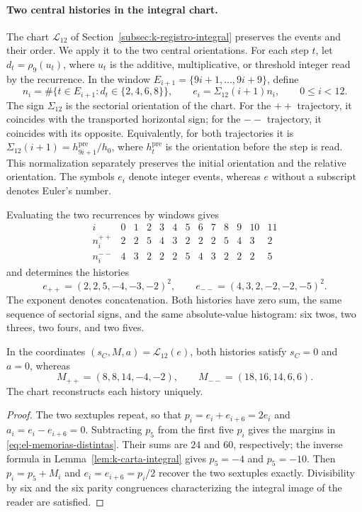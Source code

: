 \paragraph{Two central histories in the integral chart.}
The chart \(\mathcal L_{12}\) of
Section~\ref{subsec:k-registro-integral} preserves the events and their
order. We apply it to the two central orientations. For each
step \(t\), let \(d_t=\rho_9(u_t)\), where \(u_t\) is the additive,
multiplicative, or threshold integer read by the recurrence.
In the window \(E_{i+1}=\{9i+1,\ldots,9i+9\}\), define
\[
 n_i=\#\{t\in E_{i+1}:d_t\in\{2,4,6,8\}\},\qquad
 e_i=\Sigma_{12}(i+1)n_i,\qquad0\le i<12.
\]
The sign \(\Sigma_{12}\) is the sectorial orientation of the chart.
For the \({++}\) trajectory, it coincides with the transported
horizontal sign; for the \({--}\) trajectory, it coincides with its opposite.
Equivalently, for both trajectories it is
\(\Sigma_{12}(i+1)=h^{\mathrm{pre}}_{9i+1}/h_0\), where
\(h^{\mathrm{pre}}_t\) is the orientation before the step is read.
This normalization separately preserves the initial orientation and
the relative orientation. The symbols \(e_i\) denote integer
events, whereas \(e\) without a subscript denotes Euler's number.

Evaluating the two recurrences by windows gives
\[
\begin{array}{c|rrrrrrrrrrrr}
i&0&1&2&3&4&5&6&7&8&9&10&11\\\hline
n_i^{++}&2&2&5&4&3&2&2&2&5&4&3&2\\
n_i^{--}&4&3&2&2&2&5&4&3&2&2&2&5
\end{array}
\]
and determines the histories
\begin{equation}
 e_{++}=(2,2,5,-4,-3,-2)^2,\qquad
 e_{--}=(4,3,2,-2,-2,-5)^2.
 \label{eq:el-historias-centrales}
\end{equation}
The exponent denotes concatenation. Both histories have zero sum,
the same sequence of sectorial signs, and the same absolute-value
histogram: six twos, two threes, two fours, and two fives.

\begin{proposition}
\label{prop:el-memorias-distintas}
In the coordinates \((s_C,M,a)=\mathcal L_{12}(e)\), both histories
satisfy \(s_C=0\) and \(a=0\), whereas
\begin{equation}
 M_{++}=(8,8,14,-4,-2),\qquad
 M_{--}=(18,16,14,6,6).
 \label{eq:el-memorias-distintas}
\end{equation}
The chart reconstructs each history uniquely.
\end{proposition}
\begin{proof}
The two sextuples repeat, so that
\(p_i=e_i+e_{i+6}=2e_i\) and \(a_i=e_i-e_{i+6}=0\).
Subtracting \(p_5\) from the first five \(p_i\) gives the margins
in \eqref{eq:el-memorias-distintas}. Their sums are \(24\) and
\(60\), respectively; the inverse formula in
Lemma~\ref{lem:k-carta-integral} gives \(p_5=-4\) and \(p_5=-10\).
Then \(p_i=p_5+M_i\) and
\(e_i=e_{i+6}=p_i/2\) recover the two sextuples exactly.
Divisibility by six and the six parity congruences characterizing
the integral image of the reader are satisfied.
\end{proof}

